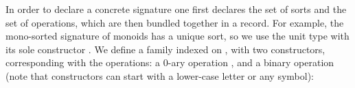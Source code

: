 In order to declare a concrete signature one first declares the set of
sorts and the set of operations, which are then bundled together in a
record.  For example, the mono-sorted signature of monoids has a
unique sort, so we use the unit type  with its sole
constructor . We define a family indexed
on
\AgdaSpace{}\AgdaSpace{}\AgdaSpace{},
with two constructors, corresponding with the operations: a 0-ary
operation , and a binary operation
 (note that constructors can start with a
lower-case letter or any symbol):

\begin{code}
\>[0]\AgdaSpace{}%
\AgdaSpace{}%
\AgdaSymbol{:}\AgdaSpace{}%
\AgdaSpace{}%
\AgdaSpace{}%
\AgdaSpace{}%
\AgdaSpace{}%
\AgdaSpace{}%
\AgdaSpace{}%
\<%
\\
\>[0][@{}l@{\AgdaIndent{0}}]%
\>[3]\AgdaSpace{}%
\AgdaSymbol{:}\AgdaSpace{}%
\AgdaSpace{}%
\AgdaSymbol{(}\AgdaInductiveConstructor{[]}\AgdaSpace{}%
\AgdaOperator{\AgdaInductiveConstructor{,}}\AgdaSpace{}%
\AgdaSymbol{)}\<%
\\
%
\>[3]\AgdaSpace{}%
\AgdaSymbol{:}\AgdaSpace{}%
\AgdaSpace{}%
\AgdaSymbol{(}\AgdaSpace{}%
\AgdaSpace{}%
\AgdaOperator{\AgdaFunction{[}}\AgdaSpace{}%
\AgdaSpace{}%
\AgdaOperator{\AgdaFunction{]}}\AgdaSpace{}%
\AgdaOperator{\AgdaInductiveConstructor{,}}\AgdaSpace{}%
\AgdaSymbol{)}\<%
\\
\\
\>[0]\AgdaSpace{}%
\AgdaSymbol{:}\AgdaSpace{}%
\<%
\\
\>[0]\AgdaSpace{}%
\AgdaSymbol{=}\AgdaSpace{}%
\AgdaSpace{}%
\AgdaSymbol{\{}\AgdaSpace{}%
\AgdaSpace{}%
\AgdaSymbol{=}\AgdaSpace{}%
\AgdaSpace{}%
\AgdaSymbol{;}\AgdaSpace{}%
\AgdaSpace{}%
\AgdaSymbol{=}\AgdaSpace{}%
\AgdaSpace{}%
\AgdaSymbol{\}}\<%
\end{code}

